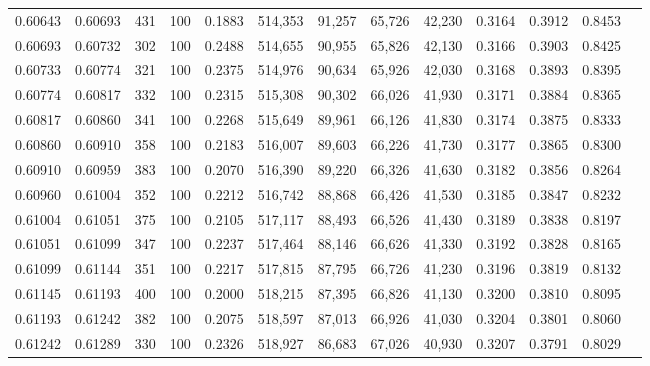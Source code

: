\begin{tabular}{rrrrrrrrrrrrr}
0.60643 & 0.60693 &   431 & 100 &                                     0.1883 & 514,353 &  91,257 &  65,726 &  42,230 & 0.3164 & 0.3912 & 0.8453 \\
0.60693 & 0.60732 &   302 & 100 &                                     0.2488 & 514,655 &  90,955 &  65,826 &  42,130 & 0.3166 & 0.3903 & 0.8425 \\
0.60733 & 0.60774 &   321 & 100 &                                     0.2375 & 514,976 &  90,634 &  65,926 &  42,030 & 0.3168 & 0.3893 & 0.8395 \\
0.60774 & 0.60817 &   332 & 100 &                                     0.2315 & 515,308 &  90,302 &  66,026 &  41,930 & 0.3171 & 0.3884 & 0.8365 \\
0.60817 & 0.60860 &   341 & 100 &                                     0.2268 & 515,649 &  89,961 &  66,126 &  41,830 & 0.3174 & 0.3875 & 0.8333 \\
0.60860 & 0.60910 &   358 & 100 &                                     0.2183 & 516,007 &  89,603 &  66,226 &  41,730 & 0.3177 & 0.3865 & 0.8300 \\
0.60910 & 0.60959 &   383 & 100 &                                     0.2070 & 516,390 &  89,220 &  66,326 &  41,630 & 0.3182 & 0.3856 & 0.8264 \\
0.60960 & 0.61004 &   352 & 100 &                                     0.2212 & 516,742 &  88,868 &  66,426 &  41,530 & 0.3185 & 0.3847 & 0.8232 \\
0.61004 & 0.61051 &   375 & 100 &                                     0.2105 & 517,117 &  88,493 &  66,526 &  41,430 & 0.3189 & 0.3838 & 0.8197 \\
0.61051 & 0.61099 &   347 & 100 &                                     0.2237 & 517,464 &  88,146 &  66,626 &  41,330 & 0.3192 & 0.3828 & 0.8165 \\
0.61099 & 0.61144 &   351 & 100 &                                     0.2217 & 517,815 &  87,795 &  66,726 &  41,230 & 0.3196 & 0.3819 & 0.8132 \\
0.61145 & 0.61193 &   400 & 100 &                                     0.2000 & 518,215 &  87,395 &  66,826 &  41,130 & 0.3200 & 0.3810 & 0.8095 \\
0.61193 & 0.61242 &   382 & 100 &                                     0.2075 & 518,597 &  87,013 &  66,926 &  41,030 & 0.3204 & 0.3801 & 0.8060 \\
0.61242 & 0.61289 &   330 & 100 &                                     0.2326 & 518,927 &  86,683 &  67,026 &  40,930 & 0.3207 & 0.3791 & 0.8029 \\

\end{tabular}
